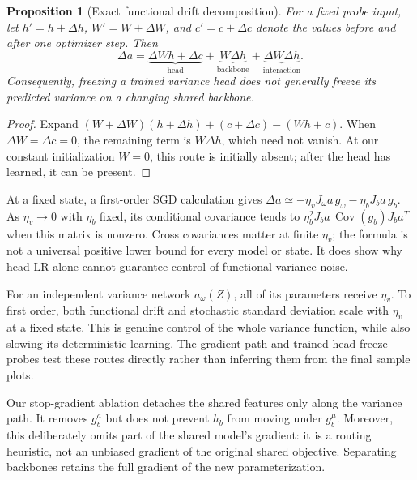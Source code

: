 \documentclass[11pt,a4paper]{article}
\newtheorem{proposition}{Proposition}[section]
\newcommand{\Cov}{\operatorname{Cov}}
\begin{document}
\begin{proposition}[Exact functional drift decomposition]
For a fixed probe input, let $h'=h+\Delta h$, $W'=W+\Delta W$, and
$c'=c+\Delta c$ denote the values before and after one optimizer step. Then
\begin{equation}
 \Delta a=\underbrace{\Delta W h+\Delta c}_{\text{head}}
          +\underbrace{W\Delta h}_{\text{backbone}}
          +\underbrace{\Delta W\Delta h}_{\text{interaction}}.
 \label{eq:drift}
\end{equation}
Consequently, freezing a trained variance head does not generally freeze its
predicted variance on a changing shared backbone.
\end{proposition}
\begin{proof}
Expand $(W+\Delta W)(h+\Delta h)+(c+\Delta c)-(Wh+c)$.
When $\Delta W=\Delta c=0$, the remaining term is $W\Delta h$, which need
not vanish. At our constant initialization $W=0$, this route is initially
absent; after the head has learned, it can be present.
\end{proof}

At a fixed state, a first-order SGD calculation gives
$\Delta a\simeq-\eta_v J_\omega a\,g_\omega-\eta_bJ_b a\,g_b$.
As $\eta_v\to0$ with $\eta_b$ fixed, its conditional covariance tends to
$\eta_b^2J_b a\,\Cov(g_b)J_b a^T$ when this matrix is nonzero. Cross
covariances matter at finite $\eta_v$; the formula is not a universal positive
lower bound for every model or state. It does show why head LR alone cannot
guarantee control of functional variance noise.

For an independent variance network $a_\omega(Z)$, all of its parameters
receive $\eta_v$. To first order, both functional drift and stochastic
standard deviation scale with $\eta_v$ at a fixed state. This is genuine
control of the whole variance function, while also slowing its deterministic
learning. The gradient-path and trained-head-freeze probes test these routes
directly rather than inferring them from the final sample plots.

Our stop-gradient ablation detaches the shared features only along the
variance path. It removes $g_b^a$ but does not prevent $h_b$ from moving under
$g_b^\mu$. Moreover, this deliberately omits part of the shared model's
gradient: it is a routing heuristic, not an unbiased gradient of the original
shared objective. Separating backbones retains the full gradient of the new
parameterization.
\end{document}
